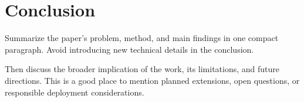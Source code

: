 \section{Conclusion}

Summarize the paper's problem, method, and main findings in one compact paragraph.
Avoid introducing new technical details in the conclusion.

Then discuss the broader implication of the work, its limitations, and future directions.
This is a good place to mention planned extensions, open questions, or responsible deployment considerations.

\newpage

